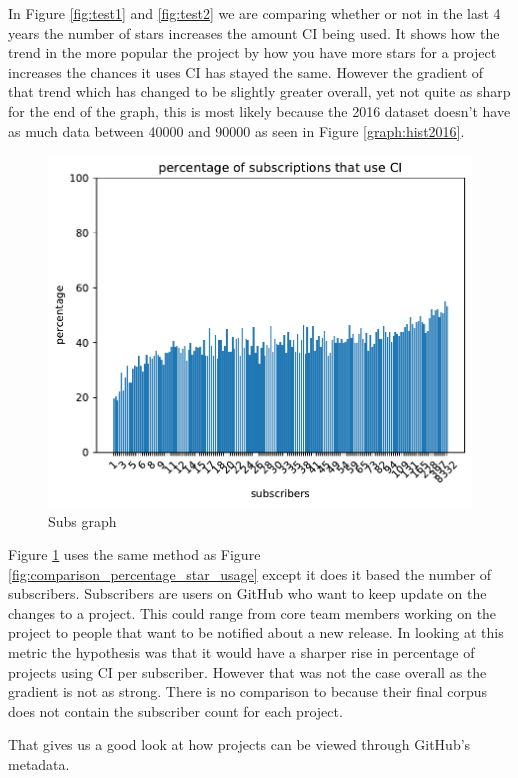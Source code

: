 \documentclass[10pt,conference]{IEEEtran}
\begin{document}
In Figure \ref{fig:test1} and \ref{fig:test2} we are comparing whether or not in the last 4 years the number of stars increases the amount CI being used. It shows how the trend in the more popular the project by how you have more stars for a project increases the chances it uses CI has stayed the same. However the gradient of that trend which has changed to be slightly greater overall, yet not quite as sharp for the end of the graph, this is most likely because the 2016 dataset doesn't have as much data between 40000 and 90000 as seen in Figure \ref{graph:hist2016}.

\begin{figure}[!h]
  \centering
  \includegraphics[width=.8\textwidth]{../src/results/percentage sub with CI.pdf}
  \caption{Subs graph}
  \label{graph_percentage_subs}
\end{figure}
Figure \ref{graph_percentage_subs} uses the same method as Figure \ref{fig:comparison_percentage_star_usage} except it does it based the number of subscribers. Subscribers are users on GitHub who want to keep update on the changes to a project. This could range from core team members working on the project to people that want to be notified about a new release. 
In looking at this metric the hypothesis was that it would have a sharper rise in percentage of projects using CI per subscriber. However that was not the case overall as the gradient is not as strong. There is no comparison to \cite{Hilton2016} because their final corpus does not contain the subscriber count for each project.

That gives us a good look at how projects can be viewed through GitHub's metadata. 
\end{document}
